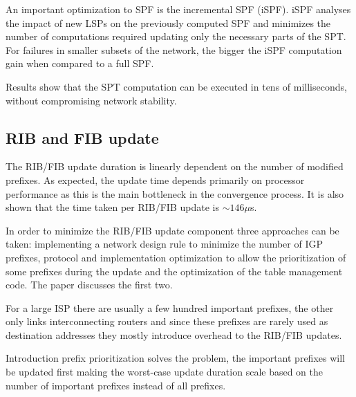 \documentclass[a4paper, 11pt, UTF8]{article}
\begin{document}
An important optimization to SPF is the incremental SPF (iSPF).
iSPF analyses the impact of new LSPs on the previously computed SPF and minimizes the number of computations required updating only the necessary parts of the SPT.
For failures in smaller subsets of the network, the bigger the iSPF computation gain when compared to a full SPF.

Results show that the SPT computation can be executed in tens of milliseconds, without compromising network stability.

\subsection{RIB and FIB update}
The RIB/FIB update duration is linearly dependent on the number of modified prefixes.
As expected, the update time depends primarily on processor performance as this is the main bottleneck in the convergence process.
It is also shown that the time taken per RIB/FIB update is $\sim146\mu$s.

In order to minimize the RIB/FIB update component three approaches can be taken: 
implementing a network design rule to minimize the number of IGP prefixes, protocol and implementation optimization to allow the prioritization of some prefixes during the update and the optimization of the table management code.
The paper discusses the first two.

For a large ISP there are usually a few hundred important prefixes, the other only links interconnecting routers and since these prefixes are rarely used as destination addresses they mostly introduce overhead to the RIB/FIB updates.

Introduction prefix prioritization solves the problem, the important prefixes will be updated first making
the worst-case update duration scale based on the number of important prefixes instead of all prefixes.
\end{document}
